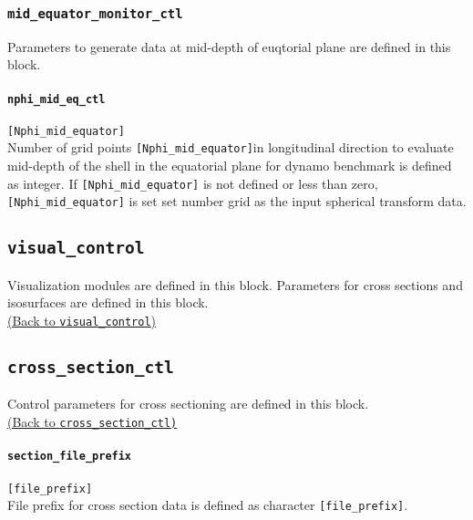 \subsubsection{\tt mid\_equator\_monitor\_ctl}
\label{href_t:mid_equator_monitor_ctl}
Parameters to generate data at mid-depth of euqtorial plane are defined in this block.

\paragraph{\tt nphi\_mid\_eq\_ctl}
\label{href_t:nphi_mid_eq_ctl}
\verb|[Nphi_mid_equator]| \\
Number of grid points \verb|[Nphi_mid_equator]|in longitudinal direction to evaluate mid-depth of the shell in the equatorial plane for dynamo benchmark is defined as integer. If \verb|[Nphi_mid_equator]| is not defined or less than zero, \verb|[Nphi_mid_equator]| is set set number grid as the input spherical transform data. 
%
%

\subsection{\tt visual\_control}
\label{href_t:visual_control}
Visualization modules are defined in this block. Parameters for cross sections and isosurfaces are defined in this block. \\
\hyperref[href_i:visual_control]{(Back to {\tt visual\_control})}

%
%
\subsection{\tt cross\_section\_ctl}
\label{href_t:cross_section_ctl}
Control parameters for cross sectioning are defined in this block. \\
\hyperref[href_i:cross_section_ctl]{(Back to {\tt cross\_section\_ctl)}}

\paragraph{\tt section\_file\_prefix}
\label{href_t:section_file_prefix}
\verb|[file_prefix]| \\
File prefix for cross section data is defined as character \verb|[file_prefix]|.

